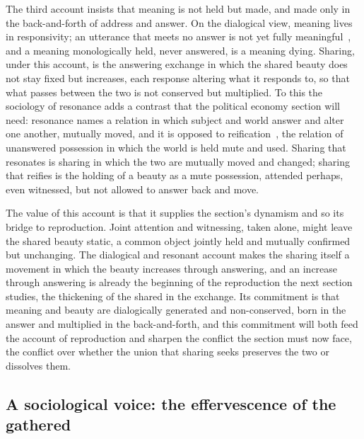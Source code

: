 The third account insists that meaning is not held but made, and made only in the back-and-forth of address and answer. On the dialogical view, meaning lives in responsivity; an utterance that meets no answer is not yet fully meaningful~\parencite{bakhtin_dialogic}, and a meaning monologically held, never answered, is a meaning dying. Sharing, under this account, is the answering exchange in which the shared beauty does not stay fixed but increases, each response altering what it responds to, so that what passes between the two is not conserved but multiplied. To this the sociology of resonance adds a contrast that the political economy section will need: resonance names a relation in which subject and world answer and alter one another, mutually moved, and it is opposed to reification~\parencite{rosa_resonance}, the relation of unanswered possession in which the world is held mute and used. Sharing that resonates is sharing in which the two are mutually moved and changed; sharing that reifies is the holding of a beauty as a mute possession, attended perhaps, even witnessed, but not allowed to answer back and move.

The value of this account is that it supplies the section's dynamism and so its bridge to reproduction. Joint attention and witnessing, taken alone, might leave the shared beauty static, a common object jointly held and mutually confirmed but unchanging. The dialogical and resonant account makes the sharing itself a movement in which the beauty increases through answering, and an increase through answering is already the beginning of the reproduction the next section studies, the thickening of the shared in the exchange. Its commitment is that meaning and beauty are dialogically generated and non-conserved, born in the answer and multiplied in the back-and-forth, and this commitment will both feed the account of reproduction and sharpen the conflict the section must now face, the conflict over whether the union that sharing seeks preserves the two or dissolves them.

\subsection{A sociological voice: the effervescence of the gathered}
\label{p22:sub:sharing-effervescence}

